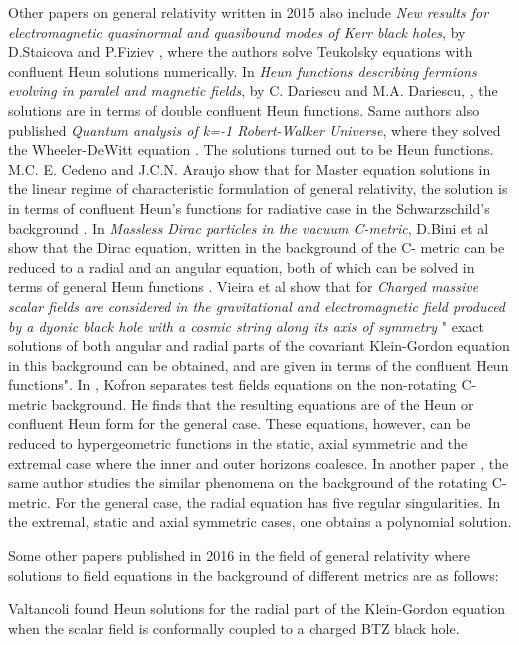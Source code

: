 \documentclass{article}
\begin{document}
\noindent Other papers on general relativity written in 2015 also
include \emph{New results for electromagnetic quasinormal and
quasibound modes of Kerr black holes}, by D.Staicova and P.Fiziev
\cite{Staicova},  where the authors solve Teukolsky equations with
confluent Heun solutions numerically. In \emph{Heun functions
describing fermions evolving in paralel and magnetic fields}, by
C. Dariescu and M.A. Dariescu, \cite {M.A.},  the solutions
are in terms of double confluent Heun functions. Same authors also
published \emph{ Quantum analysis of k=-1 Robert-Walker Universe},
where they solved the Wheeler-DeWitt equation \cite{M.A.1}. The
solutions turned out to be Heun functions.  M.C. E. Cedeno and
 J.C.N. Araujo show that for Master equation solutions in the linear regime of characteristic
formulation of general relativity, the  solution is in terms of
confluent Heun's functions for radiative  case in the
Schwarzschild's background \cite{Cedeno}. In \emph{Massless Dirac
particles in the vacuum C-metric}, D.Bini et al show that the Dirac
equation, written in the background of the C- metric can be
reduced to a radial and an angular equation, both of which can be
solved in terms of general Heun functions \cite{Bini}. Vieira et
al\cite{Silva} show that for \emph{Charged massive scalar fields are
considered in the gravitational and electromagnetic field produced
by a dyonic black hole with a cosmic string along its axis of
symmetry} " exact solutions of both angular and radial parts of the
covariant Klein-Gordon equation in this background can be obtained,
and are given in terms of the confluent Heun functions". In
\cite{Kofron1} , Kofron separates test fields equations on the
non-rotating C- metric background. He finds that the resulting
equations are of the Heun or confluent Heun form for the general
case. These equations, however, can be reduced to hypergeometric
functions in the static, axial symmetric and the extremal case
where the inner and outer horizons coalesce. In another paper
\cite{Kofron2}, the same author studies the similar phenomena on
the background of the rotating C- metric. For the general case,
the radial equation has five regular singularities. In the
extremal, static and axial symmetric cases, one obtains a
polynomial solution.

Some other papers  published in 2016 in the field of general
relativity where solutions  to field equations in the background
of different metrics are as follows:

\noindent
 Valtancoli \cite{Valtancoli} found Heun
solutions for the radial part of the Klein-Gordon equation when
 the scalar field is conformally coupled to a charged BTZ black hole.
\end{document}
